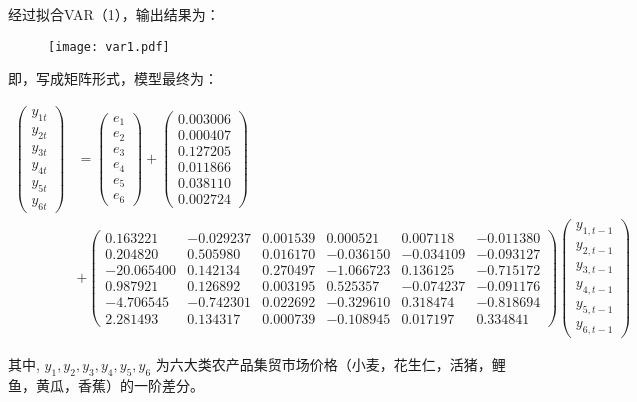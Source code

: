 \documentclass[a4paper,AutoFakeBold,AutoFakeSlant]{ctexart}
\begin{document}
经过拟合VAR（1），输出结果为：
\begin{figure}[H]
  \centering
  \texttt{[image: var1.pdf]}
  \label{f11}
\end{figure}

即，写成矩阵形式，模型最终为：
\begin{small}
\begin{equation*}
  \begin{aligned}
    \left(\begin{array}{c}
      y_{1 t} \\
      y_{2 t} \\
      y_{3 t} \\
      y_{4 t} \\
      y_{5 t} \\
      y_{6 t}
    \end{array}\right)&=\left(\begin{array}{c}
      e_{1} \\
      e_{2} \\
      e_{3} \\
      e_{4} \\
      e_{5} \\
      e_{6}
    \end{array}\right)+\left(\begin{array}{c}
      0.003006 \\
      0.000407 \\
      0.127205 \\
      0.011866 \\
      0.038110 \\
      0.002724
    \end{array}\right)\\&+\left(\begin{array}{cccccc}
      0.163221 & -0.029237 & 0.001539 & 0.000521 & 0.007118 & -0.011380\\
      0.204820 & 0.505980  & 0.016170 &-0.036150 & -0.034109 & -0.093127\\
      -20.065400 &0.142134 & 0.270497& -1.066723& 0.136125& -0.715172\\
      0.987921 &0.126892  &0.003195  &0.525357 &-0.074237  &-0.091176 \\
      -4.706545 &-0.742301 &0.022692 & -0.329610 &0.318474 & -0.818694\\
      2.281493 & 0.134317& 0.000739& -0.108945&0.017197  &0.334841
    \end{array}\right)
    \left(\begin{array}{c}
      y_{1, t-1} \\
      y_{2, t-1} \\
      y_{3, t-1} \\
      y_{4, t-1} \\
      y_{5, t-1} \\
      y_{6, t-1}
    \end{array}\right)
  \end{aligned}
\end{equation*}
\end{small}
其中, $y_1, y_2, y_3, y_4, y_5, y_6$ 为六大类农产品集贸市场价格（小麦，花生仁，活猪，鲤鱼，黄瓜，香蕉）的一阶差分。
\end{document}
